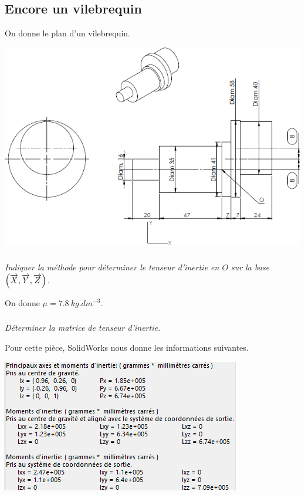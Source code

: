 \documentclass[10pt,fleqn]{article} %
\begin{document}
\def\pathfig{images}

\vspace{5cm}
\pagestyle{fancy}
\thispagestyle{plain}

\def\columnseprulecolor{\color{ocre}}
\setlength{\columnseprule}{0.4pt} 

\def\pathfig{images}

\ifprof
\else
\begin{multicols}{2}
\fi
\section*{Encore un vilebrequin}
On donne le plan d'un vilebrequin. 

\begin{center}
\includegraphics[width=\linewidth]{images/plan.png}
\end{center}

\subparagraph{}
\textit{Indiquer la méthode pour déterminer le tenseur d'inertie en $O$ sur la base $\left(\overrightarrow{X},\overrightarrow{Y},\overrightarrow{Z} \right)$.}
\ifprof
\begin{corrige}
\end{corrige}
\else
\fi

On donne $\mu=\SI{7,8}{kg.dm^{-3}}$.
\subparagraph{}
\textit{Déterminer la matrice de tenseur d'inertie.}
\ifprof
\begin{corrige}
\end{corrige}
\else
\fi

Pour cette pièce, SolidWorks nous donne les informations suivantes. 
\begin{center}
\includegraphics[width=\linewidth]{images/SW_03.png}
\end{center}


\end{multicols}
\end{document}
